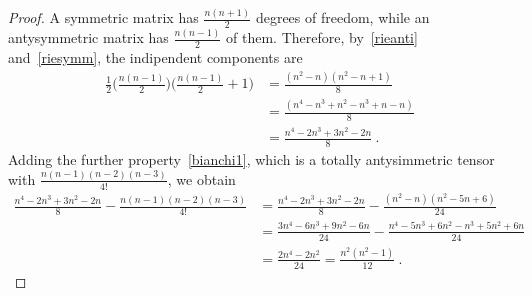     \begin{proof}
        A symmetric matrix has $\frac{n(n+1)}{2}$ degrees of freedom, while an antysymmetric matrix has $\frac{n(n-1)}{2}$ of them. Therefore, by~\eqref{rieanti} and~\eqref{riesymm}, the indipendent components are 
        \begin{equation*}
        \begin{aligned}
            \frac{1}{2} \Big ( \frac{n(n-1)}{2} \Big) \Big ( \frac{n(n-1)}{2} + 1 \Big) & = \frac{(n^2 - n) (n^2 - n + 1)}{8} \\ & = \frac{(n^4 - n^3 + n^2 - n^3 + n - n) }{8} \\ & = \frac{n^4 - 2n^3 + 3n^2 - 2n}{8} ~.
        \end{aligned}
        \end{equation*}
        Adding the further property~\eqref{bianchi1}, which is a totally antysimmetric tensor with $\frac{n(n-1)(n-2)(n-3)}{4!}$, we obtain
        \begin{equation*}
        \begin{aligned}
            \frac{n^4 - 2n^3 + 3n^2 - 2n}{8} - \frac{n(n-1)(n-2)(n-3)}{4!} & =  \frac{n^4 - 2n^3 + 3n^2 - 2n}{8} - \frac{ (n^2 - n) (n^2 - 5n + 6)}{24} \\ & = \frac{3n^4 - 6n^3 + 9n^2 - 6n}{24} - \frac{ n^4 - 5 n^3 + 6n^2 - n^3 + 5 n^2 + 6n}{24} \\ & = \frac{2 n^4 - 2n^2}{24} = \frac{n^2 (n^2 - 1)}{12} ~. 
        \end{aligned}
        \end{equation*}
    \end{proof}

